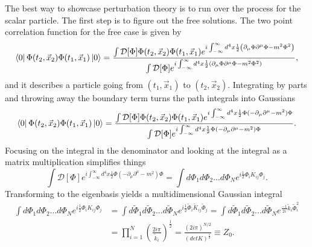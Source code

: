 The best way to showcase perturbation theory is to run over the process for the scalar particle. The first step is to figure out the free solutions. The two point correlation function for the free case is given by
\begin{equation}
\bra{0}\Phi(t_2,\vec{x}_2)\Phi(t_1,\vec{x}_1)\ket{0} = 
\frac{\int \mathcal{D}[\Phi]\Phi(t_2,\vec{x}_2)\Phi(t_1,\vec{x}_1)e^{i\int_{-\infty}^{\infty} d^4x \frac{1}{2}\left(\partial_\mu\Phi\partial^\mu\Phi - m^2 \Phi^2 \right)}}
{\int \mathcal{D}[\Phi]e^{i\int_{-\infty}^{\infty} d^4x \frac{1}{2}\left(\partial_\mu\Phi\partial^\mu\Phi - m^2 \Phi^2 \right)}},
\end{equation}
and it describes a particle going from $(t_1,\vec{x}_1)$ to $(t_2,\vec{x}_2)$. Integrating by parts and throwing away the boundary term turns the path integrals into Gaussians 
\begin{equation}
\bra{0}\Phi(t_2,\vec{x}_2)\Phi(t_1,\vec{x}_1)\ket{0} = 
\frac{\int \mathcal{D}[\Phi]\Phi(t_2,\vec{x}_2)\Phi(t_1,\vec{x}_1)e^{i\int_{-\infty}^{\infty} d^4x \frac{1}{2}\Phi (-\partial_\mu\partial^\mu - m^2)\Phi}}
{\int \mathcal{D}[\Phi]e^{i\int_{-\infty}^{\infty} d^4x \frac{1}{2}\Phi (-\partial_\mu\partial^\mu - m^2)\Phi}}.
\end{equation}
Focusing on the integral in the denominator and looking at the integral as a matrix multiplication simplifies things 
\begin{equation}
\int \mathcal{D}[\Phi]e^{i\int_{-\infty}^{\infty} d^4x \frac{1}{2}\Phi (-\partial_\mu\partial^\mu - m^2)\Phi}
= \int d\Phi_1 d\Phi_2 ... d\Phi_N e^{i\frac{1}{2}\Phi_{i} K_{ij} \Phi_{j}}.
\end{equation}
Transforming to the eigenbasis yields a multidimensional Gaussian integral
\begin{equation}
\begin{split}
 \int d\Phi_1 d\Phi_2 ... d\Phi_N e^{i\frac{1}{2}\Phi_{i} K_{ij} \Phi_{j}} 
 &= \int d\tilde{\Phi}_1 d\tilde{\Phi}_2 ... d\tilde{\Phi}_N e^{i\frac{1}{2}\tilde{\Phi}_{i} \tilde{K}_{ij} \tilde{\Phi}_{j}} 
 = \int d\tilde{\Phi}_1 d\tilde{\Phi}_2 ... d\tilde{\Phi}_N e^{\frac{-1}{2i} \tilde{k}_i \tilde{\Phi}_{i}^2} \\ 
& = \prod_{i=1}^N \left( \frac{2i\pi}{\tilde{k}_i} \right)^\frac{1}{2} = \frac{\left( 2i\pi \right)^{N/2}}{ \left( detK \right)^\frac{1}{2}} \equiv Z_0.
\end{split}
\end{equation}

